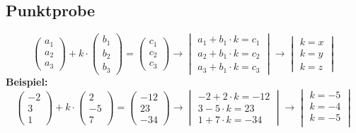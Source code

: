 	\subsection{Punktprobe}
		$$
\begin{pmatrix} 
a_{1} \\
a_{2} \\
a_{3}
\end{pmatrix}+k\cdot
\begin{pmatrix} 
b_{1} \\
b_{2} \\
b_{3}
\end{pmatrix}=
\begin{pmatrix} 
c_{1} \\
c_{2} \\
c_{3}
\end{pmatrix} \rightarrow
\begin{vmatrix}
a_{1}+b_{1}\cdot k=c_{1} \\
a_{2}+b_{1}\cdot k=c_{2} \\
a_{3}+b_{1}\cdot k=c_{3}
\end{vmatrix} \rightarrow
\begin{vmatrix}
k=x \\
k=y \\
k=z
\end{vmatrix}
$$
		\textbf{Beispiel:}
			$$
\begin{pmatrix} 
-2 \\
3 \\
1
\end{pmatrix}+k\cdot
\begin{pmatrix} 
2 \\
-5 \\
7
\end{pmatrix}=
\begin{pmatrix} 
-12 \\
23 \\
-34
\end{pmatrix} \rightarrow
\begin{vmatrix}
-2+2 \cdot k=-12\\
3-5 \cdot k=23\\
1+7 \cdot k=-34
\end{vmatrix} \rightarrow
\begin{vmatrix}
k=-5 \\
k=-4 \\
k=-5 \\
\end{vmatrix}
$$